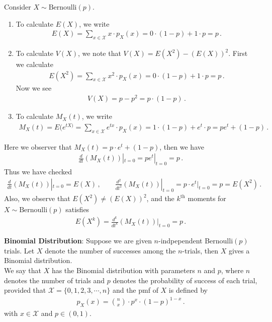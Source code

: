 \documentclass[11pt,oneside]{book}
\theoremstyle{newStyle}
\begin{document}
Consider $X \sim \text{Bernoulli}(p)$.
\begin{enumerate}
\item To calculate $E(X)$, we write
\begin{align*}
E(X) = \sum_{x \in \mathcal{X}}x\cdot p_X(x) = 0\cdot (1-p) + 1\cdot p = p\,.
\end{align*}
\item To calculate $V(X)$, we note that $
V(X) = E(X^2) - (E(X))^2$. First we calculate
\begin{align*}
E(X^2) = \sum_{x \in \mathcal{X}} x^2 \cdot p_X(x) = 0\cdot (1-p) + 1\cdot p = p\,.
\end{align*}
Now we see
\begin{align*}
V(X) = p - p^2 = p\cdot (1-p)\,.
\end{align*}
\item To calculate $M_X(t)$, we write
\begin{align*}
M_X(t) = E(e^{tX)} = \sum_{x \in \mathcal{X}} e^{tx}\cdot p_X(x) = 1\cdot (1-p) + e^t \cdot p = pe^t + (1-p)\,.
\end{align*}
\end{enumerate}
Here we observer that $M_X(t) = p\cdot e^t + (1-p)$, then we have
\begin{align*}
\frac{d}{dt}(M_X(t))|_{t=0} = pe^t|_{t=0} = p\,.
\end{align*}
Thus we have checked 
\begin{align*}
\frac{d}{dt}(M_X(t))|_{t=0} = E(X)\,,\qquad
\frac{d^2}{dt^2}(M_X(t))|_{t=0} = p\cdot e^t|_{t=0} = p = E(X^2)\,.
\end{align*}
Also, we observe that $E(X^2) \neq (E(X))^2$, and the $k^\text{th}$ moments for $X \sim \text{Bernoulli}(p)$ satisfies
\begin{align*}
E(X^k) = \frac{d^k}{dt^k}(M_X(t))|_{t=0} = p\,.
\end{align*}
\newpage


\textbf{Binomial Distribution}: Suppose we are given $n$-indpependent Bernoulli$(p)$ trials. Let $X$ denote the number of successes among the $n$-trials, then $X$ gives a Binomial distribution.\\

We say that $X$ has the Binomial distribution with parameters $n$ and $p$, where $n$ denotes the number of trials and $p$ denotes the probability of success of each trial, provided that $\mathcal{X} = \{0,1,2,3,\cdots, n\}$ and the pmf of $X$ is defined by
\begin{align*}
p_X(x) = \binom{n}{x}\cdot p^x \cdot (1-p)^{1-x}\,.
\end{align*}
with $x \in \mathcal{X}$ and $p\in (0,1)$. \\
\end{document}
